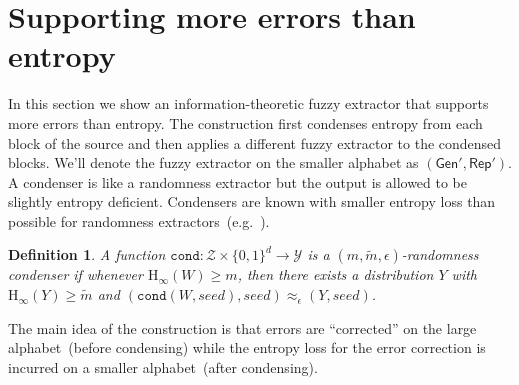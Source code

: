 \documentclass[11pt]{article}
\newcommand{\lemref}[1]{\mbox{Lemma~\ref{#1}}}
\newcommand{\class}[1]{{\ensuremath{\mathsf{#1}}}}
\newcommand{\gen}{\ensuremath{\class{Gen}}\xspace}
\newcommand{\rep}{\ensuremath{\class{Rep}}\xspace}
\newcommand{\zo}{\ensuremath{\{0, 1\}}}
\newcommand{\Hoo}{\mathrm{H}_\infty}
\newcommand{\cond}{\ensuremath{\mathtt{cond}}}
\newtheorem{definition}[theorem]{Definition}
\begin{document}
\section{Supporting more errors than entropy}
\label{sec:info theory cons}
In this section we show an information-theoretic fuzzy extractor that supports more errors than entropy.
The construction first condenses entropy from each block of the source and then applies a different fuzzy extractor to the condensed blocks. We'll denote the fuzzy extractor on the smaller alphabet as $(\gen', \rep')$.  A condenser is like a randomness extractor but the output is allowed to be slightly entropy deficient.  Condensers are known with smaller entropy loss than possible for randomness extractors~(e.g.~\cite{dodis2014key}).
\begin{definition}
\label{def:conductor}
A function $\cond : \mathcal{Z}\times \zo^d\rightarrow \mathcal{Y}$ is a $(m, \tilde{m}, \epsilon)$-randomness condenser if whenever $\Hoo(W)\ge m$, then there exists a distribution $Y$ with $\Hoo(Y)\ge \tilde{m}$ and $(\cond(W, seed), seed) \approx_\epsilon (Y, seed)$.
\end{definition}

The main idea of the construction is that errors are ``corrected'' on the large alphabet~(before condensing) while the entropy loss for the error correction is incurred on a smaller alphabet~(after condensing).
\end{document}

